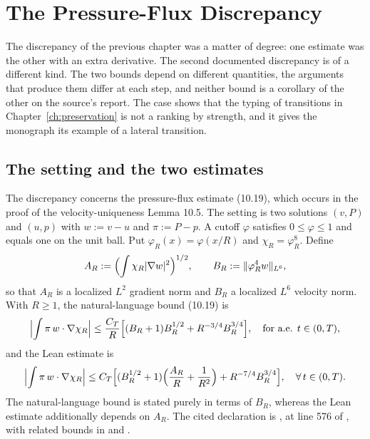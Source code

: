 \chapter{The Pressure-Flux Discrepancy}
\label{ch:pressure}

The discrepancy of the previous chapter was a matter of degree: one estimate was the other with an extra derivative. The second documented discrepancy is of a different kind. The two bounds depend on different quantities, the arguments that produce them differ at each step, and neither bound is a corollary of the other on the source's report. The case shows that the typing of transitions in Chapter~\ref{ch:preservation} is not a ranking by strength, and it gives the monograph its example of a lateral transition.

\section{The setting and the two estimates}

The discrepancy concerns the pressure-flux estimate (10.19), which occurs in the proof of the velocity-uniqueness Lemma 10.5. The setting is two solutions $(v, P)$ and $(u, p)$ with $w := v - u$ and $\pi := P - p$. A cutoff $\varphi$ satisfies $0 \le \varphi \le 1$ and equals one on the unit ball. Put $\varphi_R(x) = \varphi(x/R)$ and $\chi_R = \varphi_R^8$. Define
\[
A_R := \Bigl( \int \chi_R |\nabla w|^2 \Bigr)^{1/2}, \qquad B_R := \|\varphi_R^4 w\|_{L^6},
\]
so that $A_R$ is a localized $L^2$ gradient norm and $B_R$ a localized $L^6$ velocity norm. With $R \ge 1$, the natural-language bound (10.19) is
\begin{equation}
\Bigl| \int \pi\, w \cdot \nabla \chi_R \Bigr| \le \frac{C_T}{R} \Bigl[ (B_R + 1) B_R^{1/2} + R^{-3/4} B_R^{3/4} \Bigr], \quad \text{for a.e. } t \in (0, T),
\label{eq:nl1019}
\end{equation}
and the Lean estimate is
\begin{equation}
\Bigl| \int \pi\, w \cdot \nabla \chi_R \Bigr| \le C_T \Bigl[ (B_R^{1/2} + 1) \Bigl( \frac{A_R}{R} + \frac{1}{R^2} \Bigr) + R^{-7/4} B_R^{3/4} \Bigr], \quad \forall\, t \in (0, T).
\label{eq:lean1019}
\end{equation}
The natural-language bound is stated purely in terms of $B_R$, whereas the Lean estimate additionally depends on $A_R$. The cited declaration is , at line 576 of , with related bounds in  and .


